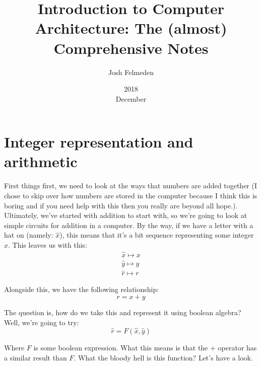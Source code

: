 \documentclass[11pt,a4paper,titlepage,dvipsnames,cmyk]{scrartcl}
\title{Introduction to Computer Architecture: The (almost) Comprehensive
Notes}
\date{2018\\ December}
\author{Josh Felmeden}
\begin{document}
\maketitle

\tableofcontents
\newpage
{}

\section{Integer representation and arithmetic}%
\label{sec:reallyboring}
First things first, we need to look at the ways that numbers are added together
(I chose to skip over how numbers are stored in the computer because I think
this is boring and if you need help with this then you really are beyond all
hope.). Ultimately, we've started with addition to start with, so we're going to
look at simple circuits for addition in a computer. By the way, if we have a
letter with a hat on (namely: $\hat x$), this means that it's a bit sequence
representing some integer $x$. This leaves us with this:
\begin{align*}
    \hat x \mapsto x \\
    \hat y \mapsto y \\
    \hat r \mapsto r
\end{align*}

Alongside this, we have the following relationship:
\begin{equation}
    r = x + y
\end{equation}

The question is, how do we take this and represent it using boolean algebra?
Well, we're going to try:
\begin{equation}
    \hat r = F(\hat x, \hat y)
\end{equation}

Where $F$ is some boolean expression. What this means is that the $+$ operator
has a similar result than $F$. What the bloody hell is this function? Let's have
a look.
\end{document}
